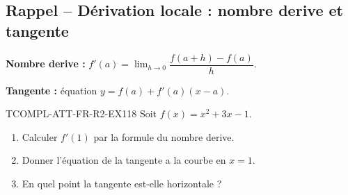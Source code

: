 

\subsection*{Rappel -- Dérivation locale : nombre derive et tangente}

\textbf{Nombre derive :} $f'(a) = \lim_{h \to 0} \dfrac{f(a+h) - f(a)}{h}$.

\textbf{Tangente :} équation $y = f(a) + f'(a)(x - a)$.

\begin{exercice}{TCOMPL-ATT-FR-R2-EX1}{1}{8}
Soit $f(x) = x^2 + 3x - 1$.
\begin{enumerate}
  \item Calculer $f'(1)$ par la formule du nombre derive.
  \item Donner l'équation de la tangente a la courbe en $x = 1$.
  \item En quel point la tangente est-elle horizontale ?
\end{enumerate}
\end{exercice}

